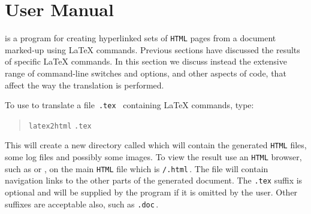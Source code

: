 \section{User Manual}
\label{sec:man}
\html{\\}\noindent
\latextohtml{} is a program for creating hyperlinked sets of \texttt{HTML} pages
from a document marked-up using \LaTeX{} commands.
Previous sections have discussed the results of specific \LaTeX{} commands.
In this section we discuss instead the extensive range
of command-line switches and options, and other aspects of \Perl{} code,
that affect the way the translation is performed.

\medskip\noindent
To use \latextohtml{} to translate a file~\texttt{.tex }
containing \LaTeX{} commands, type:
\begin{quote}
\texttt{latex2html} \texttt{.tex} 
\end{quote}

%
%
%
\html{\\}%
\noindent
This will create a new directory called  which will contain 
the generated \texttt{HTML} files, some log files and possibly some images.
To view the result use an \texttt{HTML} browser, such as 
 or ,
on the main \texttt{HTML} file which is \texttt{/.html}\,. 
The file will contain navigation links 
to the other parts of the generated document.
%
%
%
The \texttt{.tex} suffix is optional and will be supplied
by the program if it is omitted by the user.
Other suffixes are acceptable also, such as \texttt{.doc}\,.

